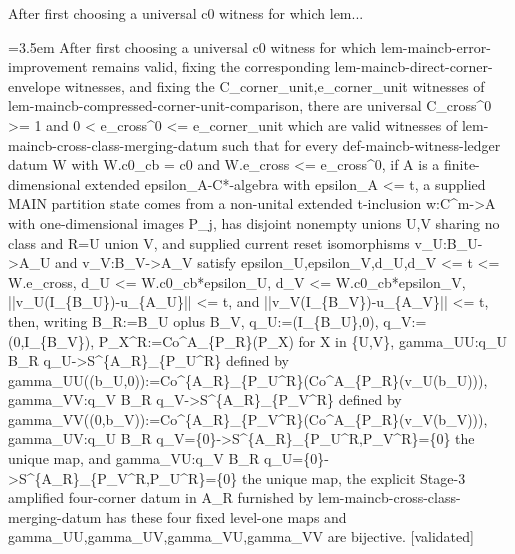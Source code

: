 \documentclass{article}
\newcommand{\step}[1]{\par\noindent\hangindent=3.5em\hangafter=1%
  \makebox[3.5em][l]{\textbf{#1.}}}
\newcommand{\steptag}[1]{\hfill{\small\textsf{[#1]}}}
\begin{document}
\begin{proofbox}{After first choosing a universal c0 witness for which lem...}
\step{1} After first choosing a universal c0 witness for which lem-maincb-error-improvement remains valid, fixing the corresponding lem-maincb-direct-corner-envelope witnesses, and fixing the C\_corner\_unit,e\_corner\_unit witnesses of lem-maincb-compressed-corner-unit-comparison, there are universal C\_cross\textasciicircum{}0 >= 1 and 0 < e\_cross\textasciicircum{}0 <= e\_corner\_unit which are valid witnesses of lem-maincb-cross-class-merging-datum such that for every def-maincb-witness-ledger datum W with W.c0\_cb = c0 and W.e\_cross <= e\_cross\textasciicircum{}0, if A is a finite-dimensional extended epsilon\_A-C*-algebra with epsilon\_A <= t, a supplied MAIN partition state comes from a non-unital extended t-inclusion w:C\textasciicircum{}m->A with one-dimensional images P\_j, has disjoint nonempty unions U,V sharing no class and R=U union V, and supplied current reset isomorphisms v\_U:B\_U->A\_U and v\_V:B\_V->A\_V satisfy epsilon\_U,epsilon\_V,d\_U,d\_V <= t <= W.e\_cross, d\_U <= W.c0\_cb*epsilon\_U, d\_V <= W.c0\_cb*epsilon\_V, ||v\_U(I\_\{B\_U\})-u\_\{A\_U\}|| <= t, and ||v\_V(I\_\{B\_V\})-u\_\{A\_V\}|| <= t, then, writing B\_R:=B\_U oplus B\_V, q\_U:=(I\_\{B\_U\},0), q\_V:=(0,I\_\{B\_V\}), P\_X\textasciicircum{}R:=Co\textasciicircum{}A\_\{P\_R\}(P\_X) for X in \{U,V\}, gamma\_UU:q\_U B\_R q\_U->S\textasciicircum{}\{A\_R\}\_\{P\_U\textasciicircum{}R\} defined by gamma\_UU((b\_U,0)):=Co\textasciicircum{}\{A\_R\}\_\{P\_U\textasciicircum{}R\}(Co\textasciicircum{}A\_\{P\_R\}(v\_U(b\_U))), gamma\_VV:q\_V B\_R q\_V->S\textasciicircum{}\{A\_R\}\_\{P\_V\textasciicircum{}R\} defined by gamma\_VV((0,b\_V)):=Co\textasciicircum{}\{A\_R\}\_\{P\_V\textasciicircum{}R\}(Co\textasciicircum{}A\_\{P\_R\}(v\_V(b\_V))), gamma\_UV:q\_U B\_R q\_V=\{0\}->S\textasciicircum{}\{A\_R\}\_\{P\_U\textasciicircum{}R,P\_V\textasciicircum{}R\}=\{0\} the unique map, and gamma\_VU:q\_V B\_R q\_U=\{0\}->S\textasciicircum{}\{A\_R\}\_\{P\_V\textasciicircum{}R,P\_U\textasciicircum{}R\}=\{0\} the unique map, the explicit Stage-3 amplified four-corner datum in A\_R furnished by lem-maincb-cross-class-merging-datum has these four fixed level-one maps and gamma\_UU,gamma\_UV,gamma\_VU,gamma\_VV are bijective. \steptag{validated} \\[6pt]

\end{proofbox}
\end{document}
